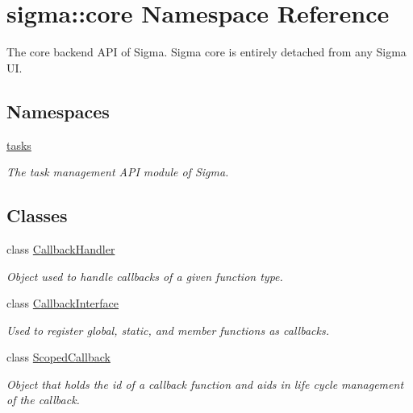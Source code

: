 \hypertarget{namespacesigma_1_1core}{}\section{sigma\+:\+:core Namespace Reference}
\label{namespacesigma_1_1core}


The core backend A\+P\+I of Sigma. Sigma core is entirely detached from any Sigma U\+I.  


\subsection*{Namespaces}
\begin{DoxyCompactItemize}
\item 
 \hyperlink{namespacesigma_1_1core_1_1tasks}{tasks}
\begin{DoxyCompactList}\small\item\em The task management A\+P\+I module of Sigma. \end{DoxyCompactList}\end{DoxyCompactItemize}
\subsection*{Classes}
\begin{DoxyCompactItemize}
\item 
class \hyperlink{classsigma_1_1core_1_1_callback_handler}{Callback\+Handler}
\begin{DoxyCompactList}\small\item\em Object used to handle callbacks of a given function type. \end{DoxyCompactList}\item 
class \hyperlink{classsigma_1_1core_1_1_callback_interface}{Callback\+Interface}
\begin{DoxyCompactList}\small\item\em Used to register global, static, and member functions as callbacks. \end{DoxyCompactList}\item 
class \hyperlink{classsigma_1_1core_1_1_scoped_callback}{Scoped\+Callback}
\begin{DoxyCompactList}\small\item\em Object that holds the id of a callback function and aids in life cycle management of the callback. \end{DoxyCompactList}\end{DoxyCompactItemize}
